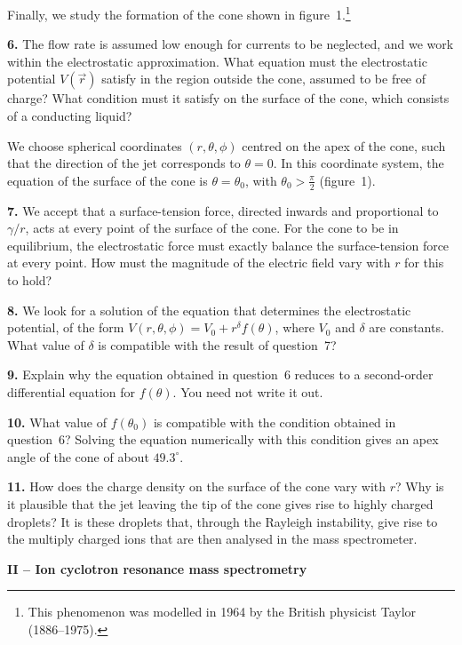 \documentclass[11pt,a4paper]{article}
\newcommand{\q}[1]{\par\medskip\noindent\textbf{#1.}\enspace}
\newcommand{\vv}[1]{\vec{#1}}
\begin{document}
Finally, we study the formation of the cone shown in
figure~1.\footnote{This phenomenon was modelled in 1964 by the British physicist Taylor
(1886--1975).}

\q{6} The flow rate is assumed low enough for currents to be neglected, and we work within the
electrostatic approximation. What equation must the electrostatic potential $V(\vv r)$ satisfy
in the region outside the cone, assumed to be free of charge? What condition must it satisfy on
the surface of the cone, which consists of a conducting liquid?

We choose spherical coordinates $(r,\theta,\phi)$ centred on the apex of the cone, such that
the direction of the jet corresponds to $\theta = 0$. In this coordinate system, the equation
of the surface of the cone is $\theta = \theta_0$, with $\theta_0 > \frac\pi2$ (figure~1).

\q{7} We accept that a surface-tension force, directed inwards and proportional to
$\gamma/r$, acts at every point of the surface of the cone. For the cone to be in equilibrium,
the electrostatic force must exactly balance the surface-tension force at every point. How must
the magnitude of the electric field vary with $r$ for this to hold?

\q{8} We look for a solution of the equation that determines the electrostatic potential, of
the form $V(r,\theta,\phi) = V_0 + r^\delta f(\theta)$, where $V_0$ and $\delta$ are
constants. What value of $\delta$ is compatible with the result of question~7?

\q{9} Explain why the equation obtained in question~6 reduces to a second-order differential
equation for $f(\theta)$. You need not write it out.

\q{10} What value of $f(\theta_0)$ is compatible with the condition obtained in question~6?
Solving the equation numerically with this condition gives an apex angle of the cone of about
$49.3^\circ$.

\q{11} How does the charge density on the surface of the cone vary with $r$? Why is it
plausible that the jet leaving the tip of the cone gives rise to highly charged droplets? It is
these droplets that, through the Rayleigh instability, give rise to the multiply charged ions
that are then analysed in the mass spectrometer.

\newpage
\begin{center}\bfseries II -- Ion cyclotron resonance mass spectrometry\end{center}
\end{document}
